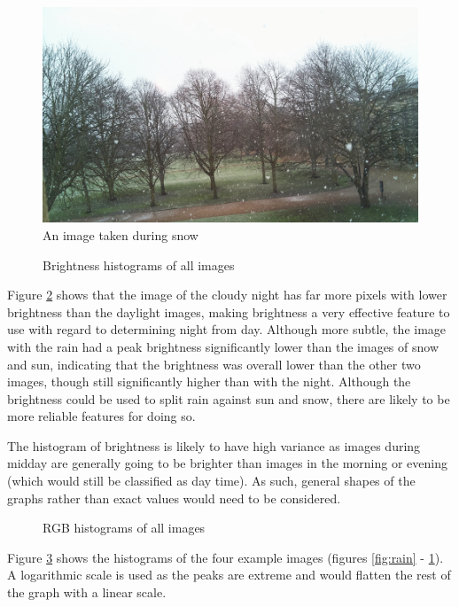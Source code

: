 \documentclass[a4paper,12pt,twoside]{report}
\begin{document}
\begin{figure}[H]
 \centering
 \includegraphics[scale=0.45]{imp-snow.png}
 \caption{An image taken during snow} 
 \label{fig:snow}
\end{figure}

\begin{figure}[H]
  \centering
  
  \caption{Brightness histograms of all images}
  \label{fig:yhist}
\end{figure}
Figure \ref{fig:yhist} shows that the image of the cloudy night has far more pixels with lower brightness than the daylight images, making brightness a very effective feature to use with regard to determining night from day. Although more subtle, the image with the rain had a peak brightness significantly lower than the images of snow and sun, indicating that the brightness was overall lower than the other two images, though still significantly higher than with the night. Although the brightness could be used to split rain against sun and snow, there are likely to be more reliable features for doing so.

The histogram of brightness is likely to have high variance as images during midday are generally going to be brighter than images in the morning or evening (which would still be classified as day time). As such, general shapes of the graphs rather than exact values would need to be considered.

\begin{figure}[H]
  \centering
  
  \caption{RGB histograms of all images}
  \label{fig:rgbhist}
\end{figure}
Figure \ref{fig:rgbhist} shows the histograms of the four example images (figures \ref{fig:rain} - \ref{fig:snow}). A logarithmic scale is used as the peaks are extreme and would flatten the rest of the graph with a linear scale.
\end{document}
